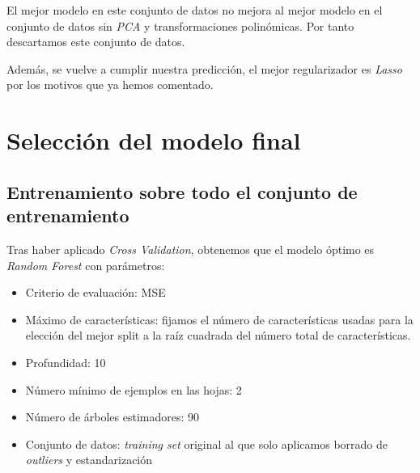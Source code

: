 \documentclass[11pt]{article}
\begin{document}
\begin{table}[H]
  \centering
  \caption{Mejores resultados}
\end{table}

El mejor modelo en este conjunto de datos no mejora al mejor modelo en el conjunto de datos sin \emph{PCA} y transformaciones polinómicas. Por tanto descartamos este conjunto de datos.

Además, se vuelve a cumplir nuestra predicción, el mejor regularizador es \emph{Lasso} por los motivos que ya hemos comentado.

\pagebreak

\section{Selección del modelo final}

\subsection{Entrenamiento sobre todo el conjunto de entrenamiento}

Tras haber aplicado \emph{Cross Validation}, obtenemos que el modelo óptimo es \emph{Random Forest} con parámetros:

\begin{itemize}
  \item Criterio de evaluación: MSE
  \item Máximo de características: fijamos el número de características usadas para la elección del mejor split a la raíz cuadrada del número total de características.
  \item Profundidad: 10
  \item Número mínimo de ejemplos en las hojas: 2
  \item Número de árboles estimadores: 90
  \item Conjunto de datos: \emph{training set} original al que solo aplicamos borrado de \emph{outliers} y  estandarización
\end{itemize}
\end{document}
